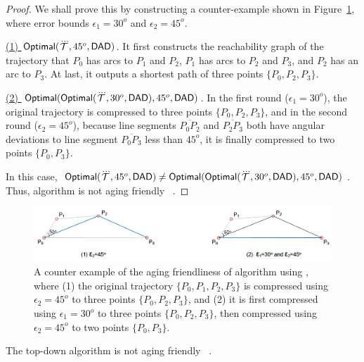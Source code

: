\begin{proof}
	We shall prove this by constructing a counter-example shown in Figure~\ref{fig:aging-opt-dad}, where error bounds $\epsilon_1 =30^o$ and $\epsilon_2=45^o$.
	
	\underline{(1) ${{\mathsf{Optimal}}}(\dddot{\mathcal{T}}, 45^o, {\mathsf{DAD}})$}.
	It first constructs the reachability graph of the trajectory that $P_0$ has arcs to $P_1$ and $P_2$, $P_1$ has arcs to $P_2$ and $P_3$, and $P_2$ has an arc to $P_3$. At last, it outputs a shortest path of three points $\{P_0, P_2, P_3\}$.
	
	\underline{(2) ${{\mathsf{Optimal}}}({\mathsf{Optimal}}(\dddot{\mathcal{T}}, 30^o, {\mathsf{DAD}}), 45^o, {\mathsf{DAD}})$}. In the first round ($\epsilon_1=30^o$), the original trajectory is compressed to three points $\{P_0, P_2, P_3\}$, and in the second round ($\epsilon_2=45^o$), because line segments  $\overline{P_0P_2}$ and $\overline{P_2P_3}$ both have angular deviations to line segment $\overline{P_0P_3}$ less than $45^o$, it is finally compressed to two points $\{P_0, P_3\}$.
	
	In this case, ${{\mathsf{Optimal}}}(\dddot{\mathcal{T}}, 45^o, {\mathsf{DAD}}) \ne {{\ensuremath {\mathsf{Optimal}}}}({\mathsf{Optimal}}(\dddot{\mathcal{T}}, 30^o, {\mathsf{DAD}}), 45^o, {\mathsf{DAD}})$. Thus, algorithm \opt is not aging friendly \wrt~\dad.
\end{proof}	
	
\begin{figure}
		\centering
		\includegraphics[scale=0.68]{Figures/Fig-aging-opt.jpg}
		
		\caption{\small A counter example of the aging friendliness of algorithm \opt using \dad, where (1) the original trajectory $\{P_0, P_1, P_2, P_3\}$ is compressed using $\epsilon_2=45^o$ to three points $\{P_0, P_2, P_3\}$, and (2) it is first compressed using $\epsilon_1=30^o$ to three points $\{P_0, P_2, P_3\}$, then compressed using $\epsilon_2=45^o$ to two points $\{P_0, P_3\}$. }
		\vspace{-1ex}
		\label{fig:aging-opt-dad}
\end{figure}


\begin{proposition}
	\label{theo-aging-dp-dad}
	The top-down algorithm \dpa is not aging friendly \wrt~\dad.
\end{proposition}

